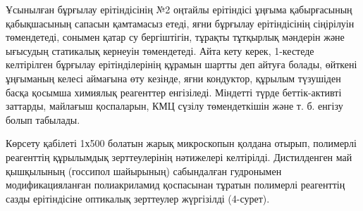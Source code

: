 \begin{multicols}{2}
Ұсынылған бұрғылау ерітіндісінің №2 оңтайлы ерітіндісі ұңғыма
қабырғасының қабықшасының сапасын қамтамасыз етеді, яғни бұрғылау
ерітіндісінің сіңірілуін төмендетеді, сонымен қатар су бергіштігін,
тұрақты тұтқырлық мәндерін және ығысудың статикалық кернеуін
төмендетеді. Айта кету керек, 1-кестеде келтірілген бұрғылау
ерітінділерінің құрамын шартты деп айтуға болады, өйткені ұңғыманың
келесі аймағына өту кезінде, яғни кондуктор, құрылым түзушіден басқа
қосымша химиялық реагенттер енгізіледі. Міндетті түрде беттік-активті
заттарды, майлағыш қоспаларын, КМЦ сүзілу төмендеткішін және т. б.
енгізу болып табылады.

Көрсету қабілеті 1х500 болатын жарық микроскопын қолдана отырып,
полимерлі реагенттің құрылымдық зерттеулерінің нәтижелері келтірілді.
Дистилденген май қышқылының (госсипол шайырының) сабындалған гудронымен
модификацияланған полиакриламид қоспасынан тұратын полимерлі реагенттің
сазды ерітіндісіне оптикалық зерттеулер жүргізілді (4-сурет).
\end{multicols}

